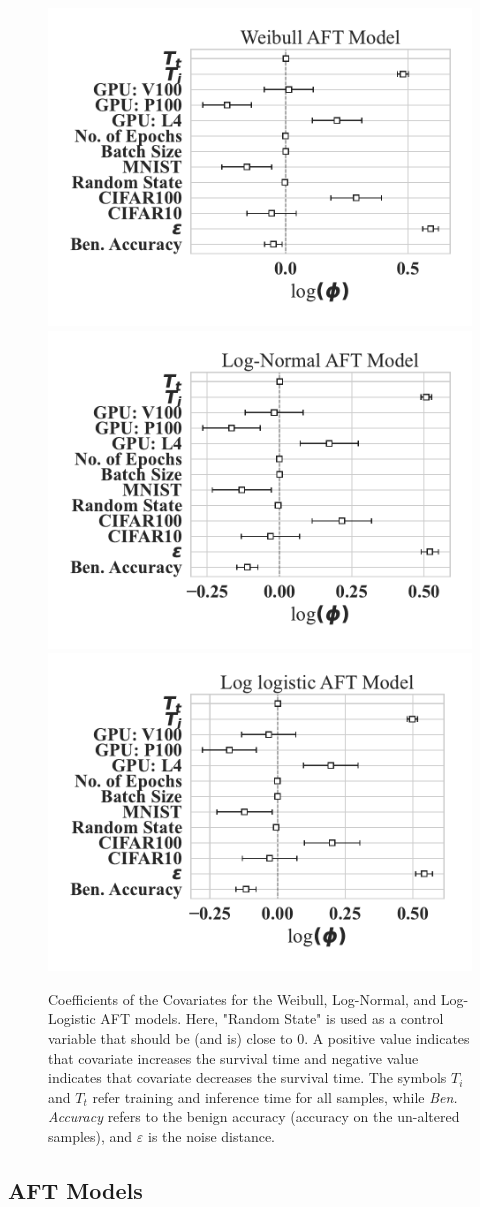 \documentclass[sn-mathphys-num]{sn-jnl}%
\begin{document}
\begin{figure}[tph!]
    \centering
        \includegraphics[width=.49\textwidth]{plots/combined/weibull_aft.pdf}
        \includegraphics[width=.49\textwidth]{plots/combined/log_normal_aft.pdf}
        \includegraphics[width=.49\textwidth]{plots/combined/log_logistic_aft.pdf}
    \caption{Coefficients of the Covariates for the Weibull, Log-Normal, and Log-Logistic AFT models. Here, "Random State" is used as a control variable that should be (and is) close to 0. A positive value indicates that covariate increases the survival time and negative value indicates that covariate decreases the survival time. The symbols $T_i$ and $T_t$ refer training and inference time for all samples, while \textit{Ben. Accuracy} refers to the benign accuracy (accuracy on the un-altered samples), and $\varepsilon$ is the noise distance.}
    \label{fig:aft}
\end{figure}
\subsection{AFT Models}
\label{res:aft}
\end{document}
